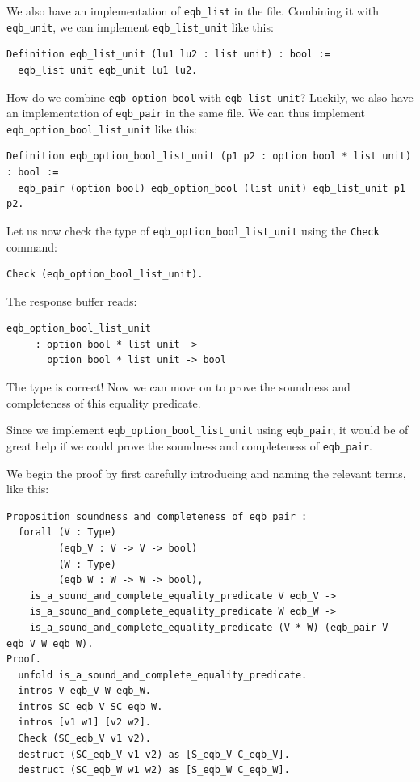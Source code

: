 \documentclass{article}
\begin{document}
We also have an implementation of \texttt{eqb\_list} in the file. Combining it with \texttt{eqb\_unit}, we can implement \texttt{eqb\_list\_unit} like this:

\begin{lstlisting}
Definition eqb_list_unit (lu1 lu2 : list unit) : bool :=
  eqb_list unit eqb_unit lu1 lu2.
\end{lstlisting}

How do we combine \texttt{eqb\_option\_bool} with \texttt{eqb\_list\_unit}? Luckily, we also have an implementation of \texttt{eqb\_pair} in the same file. We can thus implement \texttt{eqb\_option\_bool\_list\_unit} like this:

\begin{lstlisting}
Definition eqb_option_bool_list_unit (p1 p2 : option bool * list unit) : bool :=
  eqb_pair (option bool) eqb_option_bool (list unit) eqb_list_unit p1 p2.
\end{lstlisting}

Let us now check the type of \texttt{eqb\_option\_bool\_list\_unit} using the \texttt{Check} command:

\begin{lstlisting}
Check (eqb_option_bool_list_unit).
\end{lstlisting}

The response buffer reads:

\begin{lstlisting}
eqb_option_bool_list_unit
     : option bool * list unit ->
       option bool * list unit -> bool
\end{lstlisting}

The type is correct! Now we can move on to prove the soundness and completeness of this equality predicate. 

Since we implement \texttt{eqb\_option\_bool\_list\_unit} using \texttt{eqb\_pair}, it would be of great help if we could prove the soundness and completeness of \texttt{eqb\_pair}.

We begin the proof by first carefully introducing and naming the relevant terms, like this:

\begin{lstlisting}
Proposition soundness_and_completeness_of_eqb_pair :
  forall (V : Type)
         (eqb_V : V -> V -> bool)
         (W : Type)
         (eqb_W : W -> W -> bool),
    is_a_sound_and_complete_equality_predicate V eqb_V ->
    is_a_sound_and_complete_equality_predicate W eqb_W ->
    is_a_sound_and_complete_equality_predicate (V * W) (eqb_pair V eqb_V W eqb_W).
Proof.
  unfold is_a_sound_and_complete_equality_predicate.
  intros V eqb_V W eqb_W.
  intros SC_eqb_V SC_eqb_W.
  intros [v1 w1] [v2 w2].
  Check (SC_eqb_V v1 v2).
  destruct (SC_eqb_V v1 v2) as [S_eqb_V C_eqb_V].
  destruct (SC_eqb_W w1 w2) as [S_eqb_W C_eqb_W].
\end{lstlisting}
\end{document}
